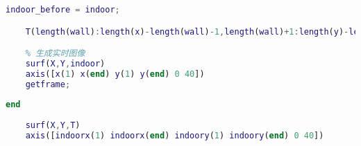 \begin{lstlisting}[language = matlab]
    indoor_before = indoor;

    T(length(wall):length(x)-length(wall)-1,length(wall)+1:length(y)-length(wall)) = indoor;

    % 生成实时图像
    surf(X,Y,indoor)
    axis([x(1) x(end) y(1) y(end) 0 40])
    getframe;
     
end
    
    surf(X,Y,T)
    axis([indoorx(1) indoorx(end) indoory(1) indoory(end) 0 40])


\end{lstlisting}